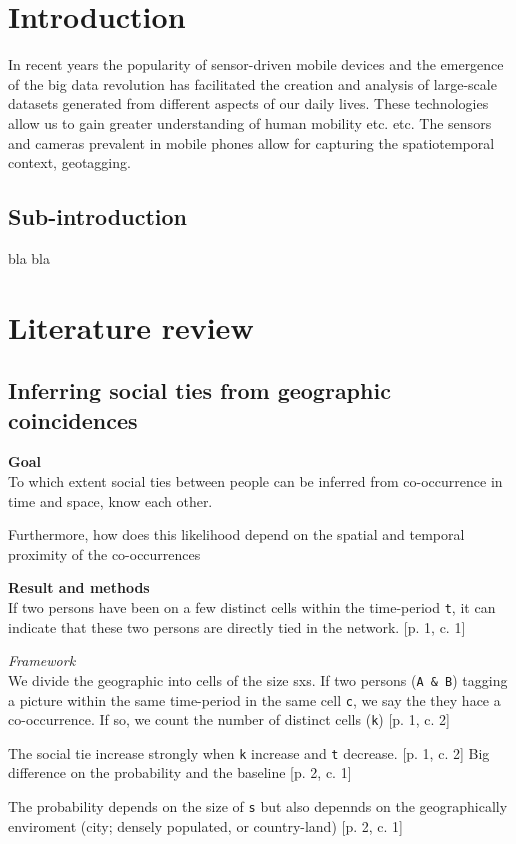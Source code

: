 \section{Introduction}
In recent years the popularity of sensor-driven mobile devices and the emergence of the big data revolution has facilitated the creation and analysis of large-scale datasets generated from different aspects of our daily lives. These technologies allow us to gain greater understanding of human mobility\cite{Uihmp} etc. etc. The sensors and cameras prevalent in mobile phones allow for capturing the spatiotemporal context, geotagging.

\subsection{Sub-introduction}
bla bla


\section{Literature review}
\subsection{Inferring social ties from geographic coincidences \cite{ISTfGC}}
\textbf{Goal}\\
To which extent social ties between people can be inferred from co-occurrence in time and space, know each other. 

Furthermore, how does this likelihood depend on the spatial and temporal proximity of the co-occurrences



\textbf{Result and methods}\\
If two persons have been on a few distinct cells within the time-period \texttt{t}, it can indicate that these two persons are directly tied in the network. [p. 1, c. 1]

\textit{Framework}\\
We divide the geographic into cells of the size sxs. 
If two persons (\texttt{A \& B}) tagging a picture within the same time-period in the same cell \texttt{c}, we say the they hace a co-occurrence. If so, we count the number of distinct cells (\texttt{k}) [p. 1, c. 2]


The social tie increase strongly when \texttt{k} increase and \texttt{t} decrease. [p. 1, c. 2]
Big difference on the probability and the baseline [p. 2, c. 1]

The probability depends on the size of \texttt{s} but also depennds on the geographically enviroment (city; densely populated, or country-land) [p. 2, c. 1]


